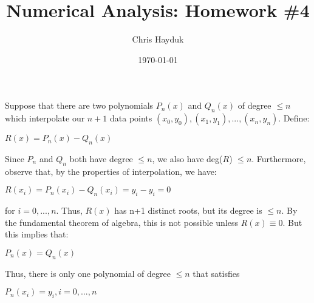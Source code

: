 \documentclass[12pt]{article}
\newenvironment{problem}[2][Problem]{\begin{trivlist}
\item[\hskip \labelsep {\bfseries #1}\hskip \labelsep {\bfseries #2.}]}{\end{trivlist}}
\begin{document}
\title{Numerical Analysis: Homework \#4}

\author{Chris Hayduk}
\date{\today}

\maketitle

\begin{problem}{1}
\end{problem}

Suppose that there are two polynomials $P_n(x)$ and $Q_n(x)$ of degree $\leq n$ which interpolate our $n+1$ data points $(x_0, y_0), (x_1, y_1), ..., (x_n, y_n)$. Define:
\begin{center}
$R(x) = P_n(x) - Q_n(x)$
\end{center}
Since $P_n$ and $Q_n$ both have degree $\leq n$, we also have deg($R$) $\leq n$. Furthermore, observe that, by the properties of interpolation, we have:
\begin{center}
$R(x_i) = P_n(x_i) - Q_n(x_i) = y_i - y_i = 0$
\end{center}
for $i = 0, ..., n$. Thus, $R(x)$ has n+1 distinct roots, but its degree is $\leq n$. By the fundamental theorem of algebra, this is not possible unless $R(x) \equiv 0$. But this implies that:
\begin{center}
$P_n(x) = Q_n(x)$
\end{center}
Thus, there is only one polynomial of degree $\leq n$ that satisfies
\begin{center}
$P_n(x_i) = y_i, i = 0, ..., n$
\end{center}

\begin{problem}{2}
\end{problem}
\end{document}

